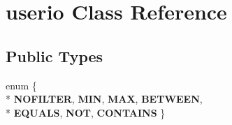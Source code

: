 \hypertarget{classuserio}{\section{userio Class Reference}
\label{dc/ddf/classuserio}
}
\subsection*{Public Types}
\begin{DoxyCompactItemize}
\item 
enum \{ \\*
{\bfseries N\-O\-F\-I\-L\-T\-E\-R}, 
{\bfseries M\-I\-N}, 
{\bfseries M\-A\-X}, 
{\bfseries B\-E\-T\-W\-E\-E\-N}, 
\\*
{\bfseries E\-Q\-U\-A\-L\-S}, 
{\bfseries N\-O\-T}, 
{\bfseries C\-O\-N\-T\-A\-I\-N\-S}
 \}
\end{DoxyCompactItemize}

